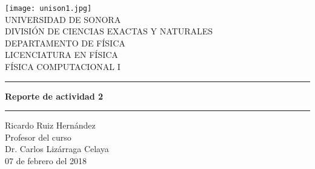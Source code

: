 \documentclass{article}
\begin{document}
\begin{center}
\texttt{[image: unison1.jpg]}
\\
\vspace{0.5cm}
UNIVERSIDAD DE SONORA \\
\vspace{0.5cm}
DIVISIÓN DE CIENCIAS EXACTAS Y NATURALES \\
\vspace{0.5cm}
DEPARTAMENTO DE FÍSICA\\
\vspace{0.5cm}
LICENCIATURA EN FÍSICA\\
\vspace{0.5cm}
FÍSICA COMPUTACIONAL I

\vspace{2 cm}
\hrule
\vspace{1 cm}

{\huge \bfseries {Reporte de actividad 2}}
\\

\vspace{1 cm}
\hrule
\vspace{2 cm}
Ricardo Ruiz Hernández\\ 
\vspace{1 cm}
Profesor del curso\\
Dr. Carlos Lizárraga Celaya\\
\vspace{2 cm}
07 de febrero del 2018
\end{center}
\end{document}
